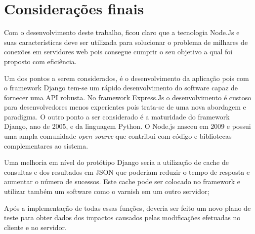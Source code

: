 \chapter{Considerações finais}
\label{conslusao-e-trabalhos-furutos}

\vspace{-1.9cm}


  Com o desenvolvimento deste trabalho, ficou claro que a tecnologia Node.Js e suas características
  deve ser utilizada para solucionar o problema de milhares de conexões em servidores web pois consegue 
  cumprir o seu objetivo a qual foi proposto com eficiência.
  
  Um dos pontos a serem considerados, é o desenvolvimento da aplicação pois com o framework Django tem-se um rápido 
  desenvolvimento do software capaz de fornecer uma API robusta. No framework Express.Js o desenvolvimento
  é custoso para desenvolvedores menos experientes pois trata-se de uma nova abordagem e paradigma. 
  O outro ponto a ser considerado é a maturidade do framework Django, ano de 2005, e da linguagem Python. O Node.js
  nasceu em 2009 e possui uma ampla comunidade \textit{open source} que contribui com código e bibliotecas complementares
  ao sistema.
  
  Uma melhoria em nível do protótipo Django seria a utilização de cache de consultas e dos resultados em JSON que poderiam
  reduzir o tempo de resposta e aumentar o número de sucessos. Este cache pode ser colocado no framework e utilizar também
  um software como o varnish em um outro servidor; 

  Após a implementação de todas essas funções, deveria ser feito um novo plano de
  teste para obter dados dos impactos causados pelas modificações efetuadas no cliente e no
  servidor.
